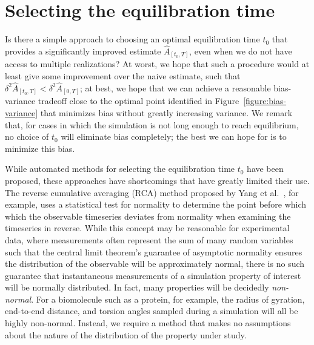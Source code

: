 \documentclass[aps,pre,twocolumn,nofootinbib,superscriptaddress,linenumbers,11point]{revtex4-1}
\begin{document}

\section*{Selecting the equilibration time}

Is there a simple approach to choosing an optimal equilibration time $t_0$ that provides a significantly improved estimate $\hat{A}_{[t_0,T]}$, even when we do not have access to multiple realizations?
At worst, we hope that such a procedure would at least give some improvement over the naive estimate, such that $\delta^2 \hat{A}_{[t_0,T]} < \delta^2 \hat{A}_{[0,T]}$; at best, we hope that we can achieve a reasonable bias-variance tradeoff close to the optimal point identified in Figure~\ref{figure:bias-variance} that minimizes bias without greatly increasing variance.
We remark that, for cases in which the simulation is not long enough to reach equilibrium, no choice of $t_0$ will eliminate bias completely; the best we can hope for is to minimize this bias.

While automated methods for selecting the equilibration time $t_0$ have been proposed, these approaches have shortcomings that have greatly limited their use.
The reverse cumulative averaging (RCA) method proposed by Yang et al.~\cite{yang-karplus:2004:jcp:reverse-cumulative-averaging}, for example, uses a statistical test for normality to determine the point before which which the observable timeseries deviates from normality when examining the timeseries in reverse.
While this concept may be reasonable for experimental data, where measurements often represent the sum of many random variables such that the central limit theorem's guarantee of asymptotic normality ensures the distribution of the observable will be approximately normal, there is no such guarantee that instantaneous measurements of a simulation property of interest will be normally distributed.
In fact, many properties will be decidedly \emph{non-normal}.
For a biomolecule such as a protein, for example, the radius of gyration, end-to-end distance, and torsion angles sampled during a simulation will all be highly non-normal.
Instead, we require a method that makes no assumptions about the nature of the distribution of the property under study.
\end{document}
